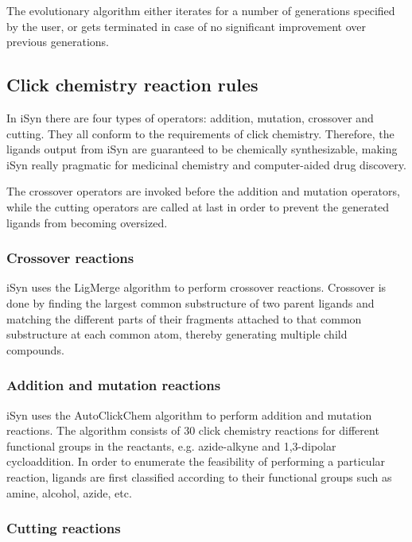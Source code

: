 The evolutionary algorithm either iterates for a number of generations specified by the user, or gets terminated in case of no significant improvement over previous generations.

\subsection{Click chemistry reaction rules}

In iSyn there are four types of operators: addition, mutation, crossover and cutting. They all conform to the requirements of click chemistry. Therefore, the ligands output from iSyn are guaranteed to be chemically synthesizable, making iSyn really pragmatic for medicinal chemistry and computer-aided drug discovery.

The crossover operators are invoked before the addition and mutation operators, while the cutting operators are called at last in order to prevent the generated ligands from becoming oversized.

\subsubsection{Crossover reactions}

iSyn uses the LigMerge algorithm \citep{1181} to perform crossover reactions. Crossover is done by finding the largest common substructure of two parent ligands and matching the different parts of their fragments attached to that common substructure at each common atom, thereby generating multiple child compounds.

\subsubsection{Addition and mutation reactions}

iSyn uses the AutoClickChem algorithm \citep{1051} to perform addition and mutation reactions. The algorithm consists of 30 click chemistry reactions for different functional groups in the reactants, e.g. azide-alkyne and 1,3-dipolar cycloaddition. In order to enumerate the feasibility of performing a particular reaction, ligands are first classified according to their functional groups such as amine, alcohol, azide, etc.

\subsubsection{Cutting reactions}

